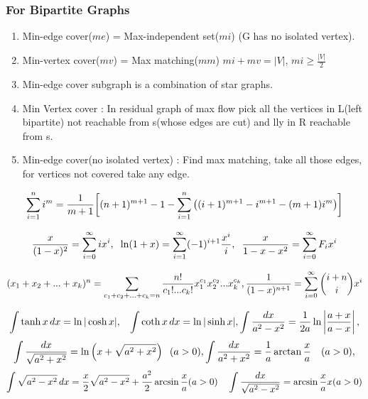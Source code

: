 \documentclass[12pt]{extarticle}
\begin{document}
\begin{multicols*}{2}
		\subsubsection*{For Bipartite Graphs}
		\begin{enumerate}
			\itemsep0em 
			\item Min-edge cover($me$) = Max-independent set($mi$) (G has no isolated vertex).
			\item Min-vertex cover($mv$) = Max matching($mm$) \hspace{5mm} $mi + mv = |V|$,\hspace{5mm} $mi \geq \frac{|V|}{2}$
			\item Min-edge cover subgraph is a combination of star graphs.
			\item Min Vertex cover : In residual graph of max flow pick all the vertices in 
			L(left bipartite) not reachable from s(whose edges are cut) and lly in R reachable from s.
			\item Min-edge cover(no isolated vertex) : Find max matching, take all those edges, for vertices not covered
			take any edge.
		\end{enumerate}
		
			$$ \sum_{i=1}^n i^m = {1 \over m+1} \bigg[ (n+1)^{m+1} - 1 - \sum_{i=1}^n \big((i+1)^{m+1} - i^{m+1} - (m+1)i^m\big) \bigg]$$
		
			$$  {x \over (1 - x)^2} = \sum_{i=0}^\infty i x^i, \hspace{2mm}
			 \ln (1 + x) = \sum_{i=1}^\infty (-1)^{i+1} {x^i \over i}, \hspace{2mm} {x \over 1 - x - x^2} = \sum_{i=0}^\infty F_i x^i$$
			
			$$ (x_1 + x_2 + ... + x_k)^n = \sum_{c_1 + c_2 + ... + c_k = n}
			\frac{n!}{c_1!...c_k!} x_1^{c_1} x_2^{c_2} ... x_k^{c_k},
			{1 \over (1-x)^{n+1}}
				= \sum_{i=0}^\infty {i+ n \choose i} x^i$$
		
	
	$$ \int \tanh x \, dx = \ln \vert \cosh x \vert, \hspace{3mm}
	 \int \coth x \, dx = \ln \vert \sinh x \vert,
	 \int {dx  \over a^2 - x^2} = {1 \over 2a} \ln\left\vert{a + x \over a - x}\right\vert, $$
	$$ \int {dx  \over \sqrt{a^2 + x^2}}= \ln \left(x + \sqrt{a^2 + x^2}\right) \hspace{0.2cm} (a > 0), \int {dx  \over a^2 + x^2}= \frac 1 a \arctan \frac x a \quad (a > 0), $$
	$$ \int \sqrt{a^2 - x^2} \, dx = \frac x 2 \sqrt{a^2 - x^2} + \frac{a^2}{2} \arcsin \frac x a (a > 0) \quad \int {dx  \over \sqrt{a^2 - x^2}} = \arcsin \frac x ax	 (a > 0) $$
	

\end{multicols*}
\end{document}
